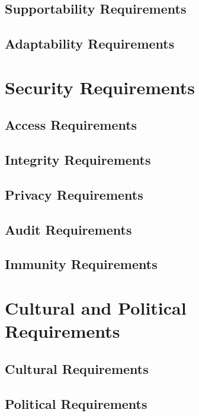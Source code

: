 \documentclass{scrreprt}
\begin{document}
\subsection{Supportability Requirements}

\subsection{Adaptability Requirements}

\section{Security Requirements}

\subsection{Access Requirements}

\subsection{Integrity Requirements}

\subsection{Privacy Requirements}

\subsection{Audit Requirements}

\subsection{Immunity Requirements}

\section{Cultural and Political Requirements}

\subsection{Cultural Requirements}

\subsection{Political Requirements}
\end{document}
